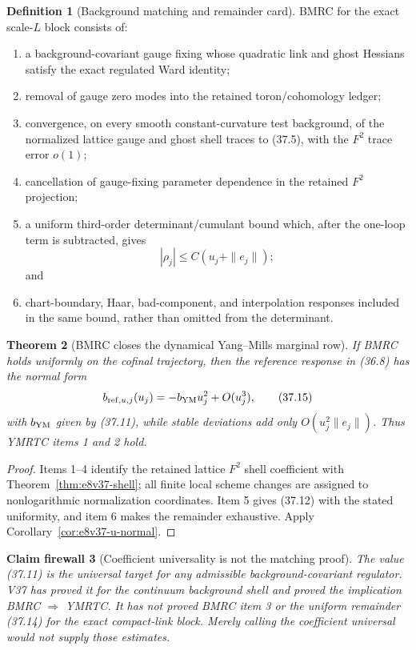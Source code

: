 \documentclass[11pt,oneside]{book}
\newtheorem{theorem}{Theorem}[chapter]
\newtheorem{firewall}[theorem]{Claim firewall}
\theoremstyle{definition}
\newtheorem{definition}[theorem]{Definition}
\theoremstyle{remark}
\begin{document}
\begin{definition}[Background matching and remainder card]
\label{def:e8v37-BMRC}
BMRC for the exact scale-\(L\) block consists of:
\begin{enumerate}
\item a background-covariant gauge fixing whose quadratic link and
      ghost Hessians satisfy the exact regulated Ward identity;
\item removal of gauge zero modes into the retained
      toron/cohomology ledger;
\item convergence, on every smooth constant-curvature test
      background, of the normalized lattice gauge and ghost shell
      traces to (37.5), with the \(F^2\) trace error \(o(1)\);
\item cancellation of gauge-fixing parameter dependence in the
      retained \(F^2\) projection;
\item a uniform third-order determinant/cumulant bound which, after
      the one-loop term is subtracted, gives
\[
 |\rho_j|\leq C(u_j+\|e_j\|);                                   \tag{37.14}
\]
      and
\item chart-boundary, Haar, bad-component, and interpolation
      responses included in the same bound, rather than omitted from
      the determinant.
\end{enumerate}
\end{definition}

\begin{theorem}[BMRC closes the dynamical Yang--Mills marginal row]
\label{thm:e8v37-BMRC}
If BMRC holds uniformly on the cofinal trajectory, then the
reference response in (36.8) has the normal form
\[
 b_{{\rm ref},u,j}(u_j)
 =
 -b_{\rm YM}u_j^2+O(u_j^3),                                     \tag{37.15}
\]
with \(b_{\rm YM}\) given by (37.11), while stable deviations add
only \(O(u_j^2\|e_j\|)\).  Thus YMRTC items 1 and 2 hold.
\end{theorem}

\begin{proof}
Items 1--4 identify the retained lattice \(F^2\) shell coefficient
with Theorem~\ref{thm:e8v37-shell}; all finite local scheme changes
are assigned to nonlogarithmic normalization coordinates.  Item 5
gives (37.12) with the stated uniformity, and item 6 makes the
remainder exhaustive.  Apply
Corollary~\ref{cor:e8v37-u-normal}.
\end{proof}

\begin{firewall}[Coefficient universality is not the matching proof]
\label{fire:e8v37-universality}
The value (37.11) is the universal target for any admissible
background-covariant regulator.  V37 has proved it for the
continuum background shell and proved the implication
BMRC \(\Rightarrow\) YMRTC.  It has not proved BMRC item 3 or the
uniform remainder (37.14) for the exact compact-link block.  Merely
calling the coefficient universal would not supply those estimates.
\end{firewall}
\end{document}
